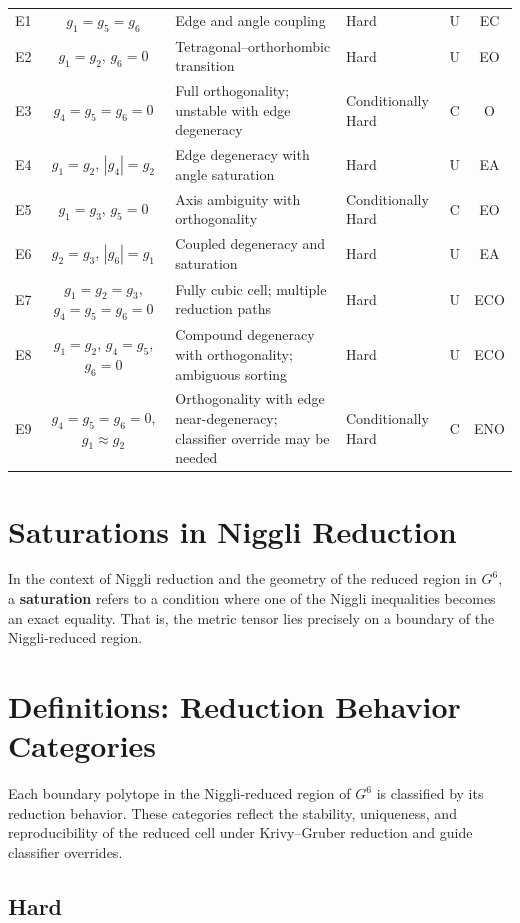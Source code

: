 \documentclass[preprint]{iucr}              %
\begin{document}
\begin{longtable}{|c|c|p{5.2cm}|p{3.8cm}|c|c|}
	E1 & $g_1 = g_5 = g_6$ & Edge and angle coupling & Hard & U & EC \\
	E2 & $g_1 = g_2$, $g_6 = 0$ & Tetragonal–orthorhombic transition & Hard & U & EO \\
	E3 & $g_4 = g_5 = g_6 = 0$ & Full orthogonality; unstable with edge degeneracy & Conditionally Hard & C & O \\
	E4 & $g_1 = g_2$, $|g_4| = g_2$ & Edge degeneracy with angle saturation & Hard & U & EA \\
	E5 & $g_1 = g_3$, $g_5 = 0$ & Axis ambiguity with orthogonality & Conditionally Hard & C & EO \\
	E6 & $g_2 = g_3$, $|g_6| = g_1$ & Coupled degeneracy and saturation & Hard & U & EA \\
	E7 & $g_1 = g_2 = g_3$, $g_4 = g_5 = g_6 = 0$ & Fully cubic cell; multiple reduction paths & Hard & U & ECO \\
E8 & $g_1 = g_2$, $g_4 = g_5$, $g_6 = 0$ & Compound degeneracy with orthogonality; ambiguous sorting & Hard & U & ECO \\
E9 & $g_4 = g_5 = g_6 = 0$, $g_1 \approx g_2$ & Orthogonality with edge near-degeneracy; classifier override may be needed & Conditionally Hard & C & ENO \\
\end{longtable}


\section*{Saturations in Niggli Reduction}

In the context of Niggli reduction and the geometry of the reduced region in $G^6$, a \textbf{saturation} refers to a condition where one of the Niggli inequalities becomes an exact equality. That is, the metric tensor lies precisely on a boundary of the Niggli-reduced region.

\section*{Definitions: Reduction Behavior Categories}

Each boundary polytope in the Niggli-reduced region of $G^6$ is classified by its reduction behavior. These categories reflect the stability, uniqueness, and reproducibility of the reduced cell under Krivy--Gruber reduction and guide classifier overrides.

\subsection*{Hard}
\end{document}

